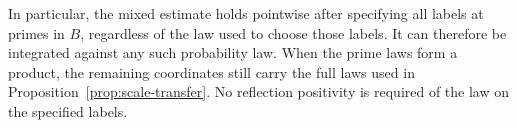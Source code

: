 In particular, the mixed estimate holds pointwise after specifying all
labels at primes in \(B\), regardless of the law used to choose those
labels.  It can therefore be integrated against any such probability
law.  When the prime laws form a product, the remaining coordinates
still carry the full laws used in Proposition~\ref{prop:scale-transfer}.
No reflection positivity is required of the law on the specified labels.
